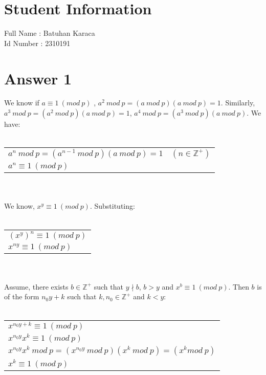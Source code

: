 \documentclass[12pt]{article}
\begin{document}
\section*{Student Information } 
Full Name : Batuhan Karaca \\
Id Number : 2310191 \\

\section*{Answer 1}

We know if $a \equiv 1\ (mod\ p)$ , $a^{2}\ mod\ p = (a\ mod\ p)(a\ mod\ p) = 1$.
Similarly, $a^{3}\ mod\ p = (a^{2}\ mod\ p)(a\ mod\ p) = 1$, $a^{4}\ mod\ p = (a^{3}\ mod\ p)(a\ mod\ p)$. 
We have: \\ \\
\begin{tabular}{l}
    $a^{n}\ mod\ p = (a^{n-1}\ mod\ p)(a\ mod\ p) = 1 \quad (n \in \mathbb{Z^{+}})$\\
    $a^{n} \equiv 1\ (mod\ p)$ \\
\end{tabular}
\\ \\
We know, $x^{y} \equiv 1\ (mod\ p)$. Substituting:
\\ \\
\begin{tabular}{l}
    $(x^{y})^{n} \equiv 1\ (mod\ p)$\\
    $x^{ny} \equiv 1\ (mod\ p)$\\
\end{tabular}
\\ \\
Assume, there exists $b \in \mathbb{Z^+}$ such that $y \nmid b$, $b>y$ and $x^{b} \equiv 1\ (mod\ p)$.
Then $b$ is of the form $n_0y+k$ such that $k,n_0 \in \mathbb{Z^+}$ and $k < y$:
\\ \\
\begin{tabular}{l}
    $x^{n_0y+k} \equiv 1\ (mod\ p)$\\
    $x^{n_0y}x^{k} \equiv 1\ (mod\ p)$\\
    $x^{n_0y}x^{k}\ mod\ p = (x^{n_0y}\ mod\ p)(x^{k}\ mod\ p) = (x^{k} mod\ p)$\\
    $x^{k} \equiv 1\ (mod\ p)$\\
\end{tabular}
\end{document}
